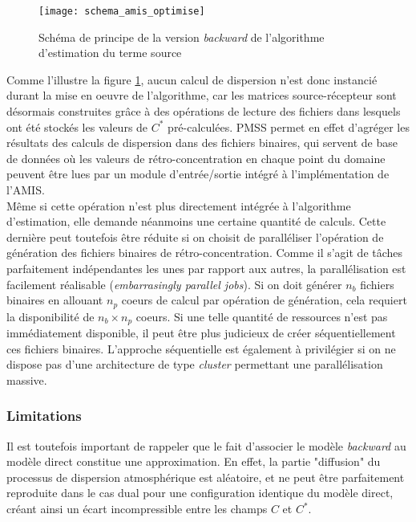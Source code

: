 \begin{figure}[h!]
	\centering
	\texttt{[image: schema\_amis\_optimise]}
	\caption{Schéma de principe de la version \textit{backward} de l'algorithme d'estimation du terme source}
	\label{fig_schema_amis_optimise}
\end{figure}

Comme l'illustre la figure \ref{fig_schema_amis_optimise}, aucun calcul de dispersion n'est donc instancié durant la mise en oeuvre de l'algorithme, car les matrices source-récepteur sont désormais construites grâce à des opérations de lecture des fichiers dans lesquels ont été stockés les valeurs de $C^*$ pré-calculées. PMSS permet en effet d'agréger les résultats des calculs de dispersion dans des fichiers binaires, qui servent de base de données où les valeurs de rétro-concentration en chaque point du domaine peuvent être lues par un module d'entrée/sortie intégré à l'implémentation de l'AMIS.\\

Même si cette opération n'est plus directement intégrée à l'algorithme d'estimation, elle demande néanmoins une certaine quantité de calculs. Cette dernière peut toutefois être réduite si on choisit de paralléliser l'opération de génération des fichiers binaires de rétro-concentration. Comme il s'agit de tâches parfaitement indépendantes les unes par rapport aux autres, la parallélisation est facilement réalisable (\textit{embarrasingly parallel jobs}). Si on doit générer $n_b$ fichiers binaires en allouant $n_p$ coeurs de calcul par opération de génération, cela requiert la disponibilité de $n_b \times n_p$ coeurs. Si une telle quantité de ressources n'est pas immédiatement disponible, il peut être plus judicieux de créer séquentiellement ces fichiers binaires. L'approche séquentielle est également à privilégier si on ne dispose pas d'une architecture de type \textit{cluster} permettant une parallélisation massive. 

\subsubsection{Limitations}

Il est toutefois important de rappeler que le fait d'associer le modèle \textit{backward} au modèle direct constitue une approximation. En effet, la partie "diffusion" du processus de dispersion atmosphérique est aléatoire, et ne peut être parfaitement reproduite dans le cas dual pour une configuration identique du modèle direct, créant ainsi un écart incompressible entre les champs $C$ et $C^*$. 

